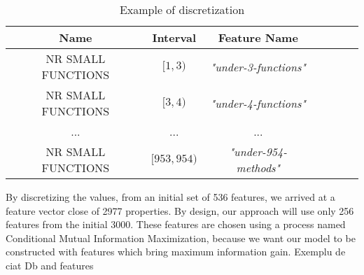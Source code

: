 \begin{table}[ht]
    \centering
    \begin{tabular}{| c | c | c | c | c | c | c | }
    \hline
    Name & Interval & Feature Name\\ \hline
    NR SMALL FUNCTIONS & $[1, 3)$ & \textit{"under-3-functions"}  \\ \hline
    NR SMALL FUNCTIONS & $[3, 4)$ & \textit{"under-4-functions"}  \\ \hline
    ... & ... & ... \\ \hline   
    NR SMALL FUNCTIONS & $[953, 954) $ & \textit{"under-954-methods"}  \\ \hline
    \end{tabular}
    \caption{Example of discretization} 
    \label{tab:discretizationeg}
\end{table}
\par
By discretizing the values, from an initial set of 536 features, we arrived at a feature vector close of 2977 properties. By design, our approach will use only 256 features from the initial 3000. These features are chosen using a process named Conditional Mutual Information Maximization, because we want our model to be constructed with features which bring maximum information gain.
Exemplu de ciat \cite{MicrosoftURL}
Db and features